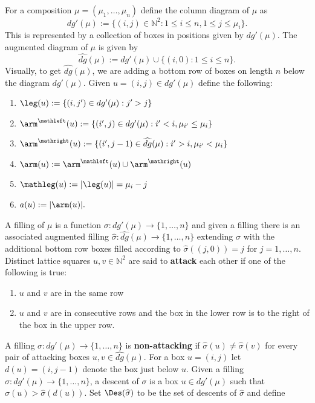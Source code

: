 \begin{defi}
For a composition $\mu = (\mu_1,\ldots,\mu_n)$ define the column diagram of $\mu$ as 
$$dg'(\mu):= \{(i,j)\in \mathbb{N}^2 : 1\leq i\leq n, 1\leq j \leq \mu_i \}.$$ This is represented by a collection of boxes in positions given by $dg'(\mu)$. The augmented diagram of $\mu$ is given by 
$$\widehat{dg}(\mu):= dg'(\mu)\cup\{(i,0): 1\leq i\leq n\}.$$
Visually, to get $\widehat{dg}(\mu)$, we are adding a bottom row of boxes on length $n$ below the diagram $dg'(\mu)$. Given $u = (i,j) \in dg'(\mu)$ define the following:
\begin{enumerate}
    \item $\leg(u) := \{(i,j') \in dg'(\mu): j' > j\}$
    \item $\arm^{\mathleft}(u) := \{(i',j) \in dg'(\mu): i'<i, \mu_{i'} \leq \mu_i\} $
    \item $\arm^{\mathright}(u):= \{(i',j-1) \in \widehat{dg}(\mu): i'>i, \mu_{i'}<\mu_{i}\}$
    \item $\arm(u) := \arm^{\mathleft}(u) \cup \arm^{\mathright}(u)$
    \item $\mathleg(u):= |\leg(u)| = \mu_i -j$
    \item $a(u) := |\arm(u)|.$
\end{enumerate}
A filling of $\mu$ is a function $\sigma: dg'(\mu) \rightarrow \{1,\ldots,n\}$ and given a filling there is an associated augmented filling $\widehat{\sigma}: \widehat{dg}(\mu) \rightarrow \{1,\ldots,n\}$ extending $\sigma$ with the additional bottom row boxes filled according to $\widehat{\sigma}((j,0)) = j$ for $j = 1,\ldots,n$. Distinct lattice squares $u,v \in \mathbb{N}^2$ are said to \textbf{attack} each other if one of the following is true:
\begin{enumerate}
\item $u$ and $v$ are in the same row 
\item $u$ and $v$ are in consecutive rows and the box in the lower row is to the right of the box in the upper row.
\end{enumerate}
A filling $\sigma: dg'(\mu) \rightarrow \{1,\ldots,n\}$ is \textbf{non-attacking} if $\widehat{\sigma}(u) \neq \widehat{\sigma}(v)$ for every pair of attacking boxes $u,v \in \widehat{dg}(\mu).$
For a box $u= (i,j)$ let $d(u) = (i,j-1)$ denote the box just below $u$. Given a filling $\sigma:dg'(\mu)\rightarrow \{1,\ldots,n\}$, a descent of $\sigma$ is a box $u \in dg'(\mu)$ such that $\widehat{\sigma}(u) > \widehat{\sigma}(d(u)).$
Set $\Des(\widehat{\sigma})$ to be the set of descents of $\widehat{\sigma}$ and define 

\end{defi}
